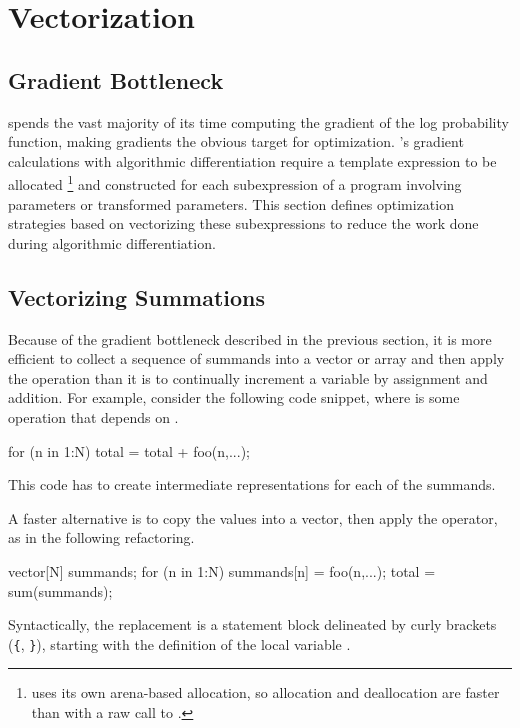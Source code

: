 \section{Vectorization}

\subsection{Gradient Bottleneck}

\Stan spends the vast majority of its time computing the gradient of
the log probability function, making gradients the obvious target for
optimization.  \Stan's gradient calculations with algorithmic
differentiation require a template expression to be allocated%
%
\footnote{\Stan uses its own arena-based allocation, so allocation and
  deallocation are faster than with a raw call to .}
%
and constructed for each subexpression of a \Stan program involving
parameters or transformed parameters.  This section defines
optimization strategies based on vectorizing these subexpressions to
reduce the work done during algorithmic differentiation.

\subsection{Vectorizing Summations}

Because of the gradient bottleneck described in the previous section,
it is more efficient to collect a sequence of summands into a vector
or array and then apply the  operation than it is to
continually increment a variable by assignment and addition.  For
example, consider the following code snippet, where  is
some operation that depends on .
%
\begin{stancode}
for (n in 1:N) 
  total = total + foo(n,...);
\end{stancode}
%
This code has to create intermediate representations for each
of the  summands.  

A faster alternative is to copy the values into a vector, then
apply the  operator, as in the following refactoring.
%
\begin{stancode}
{  
  vector[N] summands;
  for (n in 1:N) 
    summands[n] = foo(n,...);
  total = sum(summands);
}
\end{stancode}
%
Syntactically, the replacement is a statement block delineated
by curly brackets (\Verb|{|, \Verb|}|), starting with the definition
of the local variable .

